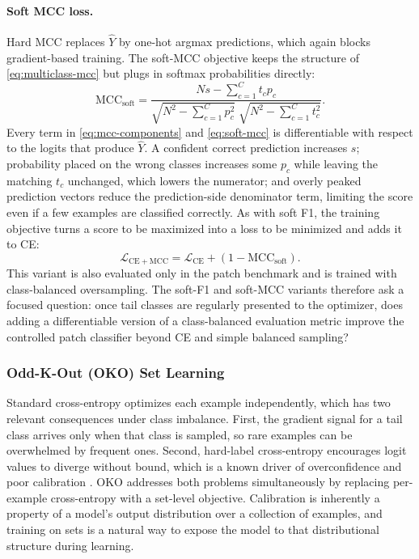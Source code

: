 \documentclass[11pt]{article}
\begin{document}
\paragraph{Soft MCC loss.}
Hard MCC replaces $\widehat{Y}$ by one-hot argmax predictions, which again blocks gradient-based training. The soft-MCC objective keeps the structure of \eqref{eq:multiclass-mcc} but plugs in softmax probabilities directly:
\begin{equation}
  \mathrm{MCC}_{\mathrm{soft}} =
  \frac{Ns - \sum_{c=1}^{C} t_c p_c}
       {\sqrt{N^2 - \sum_{c=1}^{C} p_c^2}\;
        \sqrt{N^2 - \sum_{c=1}^{C} t_c^2}}.
  \label{eq:soft-mcc}
\end{equation}
\noindent Every term in \eqref{eq:mcc-components} and \eqref{eq:soft-mcc} is differentiable with respect to the logits that produce $\widehat{Y}$. A confident correct prediction increases $s$; probability placed on the wrong classes increases some $p_c$ while leaving the matching $t_c$ unchanged, which lowers the numerator; and overly peaked prediction vectors reduce the prediction-side denominator term, limiting the score even if a few examples are classified correctly. As with soft F1, the training objective turns a score to be maximized into a loss to be minimized and adds it to CE:
\begin{equation}
  \mathcal{L}_{\mathrm{CE+MCC}} =
  \mathcal{L}_{\mathrm{CE}} + \left(1-\mathrm{MCC}_{\mathrm{soft}}\right).
  \label{eq:ce-soft-mcc}
\end{equation}
\noindent This variant is also evaluated only in the patch benchmark and is trained with class-balanced oversampling. The soft-F1 and soft-MCC variants therefore ask a focused question: once tail classes are regularly presented to the optimizer, does adding a differentiable version of a class-balanced evaluation metric improve the controlled patch classifier beyond CE and simple balanced sampling?

\subsubsection{Odd-K-Out (OKO) Set Learning}
Standard cross-entropy optimizes each example independently, which has two relevant consequences under class imbalance. First, the gradient signal for a tail class arrives only when that class is sampled, so rare examples can be overwhelmed by frequent ones. Second, hard-label cross-entropy encourages logit values to diverge without bound, which is a known driver of overconfidence and poor calibration \citep{guo2017calibration}. OKO \citep{muttenthaler2024setLearning} addresses both problems simultaneously by replacing per-example cross-entropy with a set-level objective. Calibration is inherently a property of a model's output distribution over a collection of examples, and training on sets is a natural way to expose the model to that distributional structure during learning.
\end{document}
